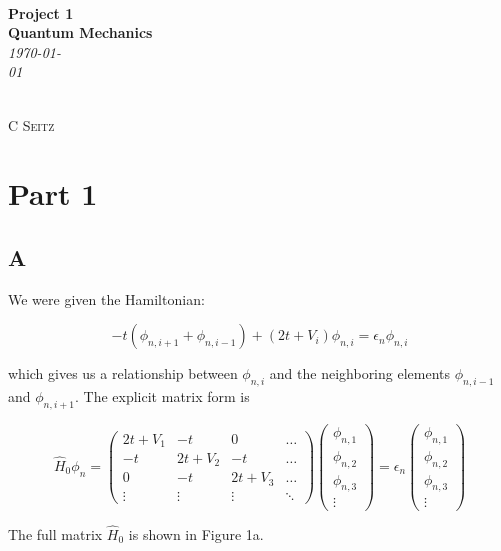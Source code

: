 \documentclass[12pt]{article}
\theoremstyle{definition}
\begin{document}
 {\noindent\Huge\bf  \\[0.5\baselineskip] {\selectfont  Project 1}         }\\[2\baselineskip] %
{ {\bf {}\selectfont Quantum Mechanics}\\ {\textit{\selectfont     \today}}}~~~~~~~~~~~~~~~~~~~~~~~~~~~~~~~~~~~~~~~~~~~~~~~~~~~~~~~~~~~~~~~~~~~~~~~~~~~~~    {\large \textsc{C Seitz}
\\[1.4\baselineskip] 

\section{Part 1}

\subsection{A}

We were given the Hamiltonian:

\begin{equation*}
-t(\phi_{n,i+1} + \phi_{n,i-1}) + (2t+V_{i})\phi_{n,i} = \epsilon_{n}\phi_{n,i}
\end{equation*}

which gives us a relationship between $\phi_{n,i}$ and the neighboring elements $\phi_{n,i-1}$ and $\phi_{n,i+1}$. The explicit matrix form is

\begin{equation}
\hat{H}_{0}\phi_{n} = \begin{pmatrix}
2t + V_{1} & -t & 0 & \hdots\\
-t & 2t + V_{2} & -t& \hdots\\
0 & -t & 2t + V_{3}& \hdots\\
\vdots & \vdots & \vdots & \ddots
\end{pmatrix}
\begin{pmatrix}
\phi_{n,1}\\
\phi_{n,2}\\
\phi_{n,3}\\
\vdots
\end{pmatrix} = \epsilon_{n}\begin{pmatrix}
\phi_{n,1}\\
\phi_{n,2}\\
\phi_{n,3}\\
\vdots
\end{pmatrix}
\end{equation}

The full matrix $\hat{H}_{0}$ is shown in Figure 1a. 

}
\end{document}
